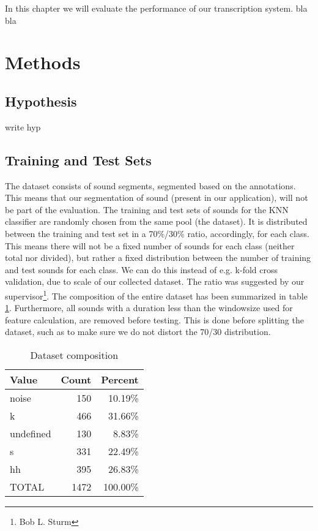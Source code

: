In this chapter we will evaluate the performance of our transcription system. bla bla

\section{Methods}
	\subsection{Hypothesis}
	write hyp

	\subsection{Training and Test Sets}
		The dataset consists of sound segments, segmented based on the annotations. This means that our segmentation of sound (present in our application), will not be part of the evaluation.
		The training and test sets of sounds for the KNN classifier are randomly chosen from the same pool (the dataset). It is distributed between the training and test set in a 70\%/30\% ratio, accordingly, for each class. This means there will not be a fixed number of sounds for each class (neither total nor divided), but rather a fixed distribution between the number of training and test sounds for each class. We can do this instead of e.g. k-fold cross validation, due to scale of our collected dataset. The ratio was suggested by our supervisor\footnote{Bob L. Sturm}. The composition of the entire dataset has been summarized in table \ref{table:eval:datasetComposition}. 
		Furthermore, all sounds with a duration less than the windowsize used for feature calculation, are removed before testing. This is done before splitting the dataset, such as to make sure we do not distort the 70/30 distribution.

		\begin{table}
			\centering
			\begin{tabular}{|l|r|r|}
				\hline
				Value  &  Count  & Percent \\ \hline
		      noise    &  150    & 10.19\% \\ \hline
		          k    &  466    & 31.66\% \\ \hline
		  undefined    &  130    &  8.83\% \\ \hline
		          s    &  331    & 22.49\% \\ \hline
		         hh    &  395    & 26.83\% \\ \hline
		      TOTAL    &  1472	 & 100.00\% \\ \hline

			\end{tabular}
			\caption{Dataset composition}
			\label{table:eval:datasetComposition}
		\end{table}


